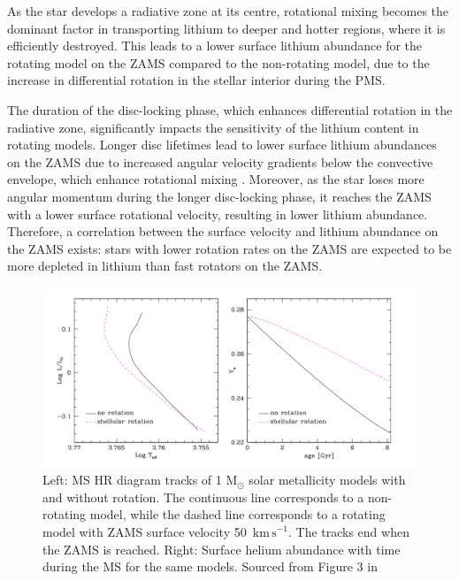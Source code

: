 As the star develops a radiative zone at its centre, rotational mixing becomes the dominant factor in transporting lithium to deeper and hotter regions, where it is efficiently destroyed. 
This leads to a lower surface lithium abundance for the rotating model on the ZAMS compared to the non-rotating model, due to the increase in differential rotation in the stellar interior during the PMS.

The duration of the disc-locking phase, which enhances differential rotation in the radiative zone, significantly impacts the sensitivity of the lithium content in rotating models. 
Longer disc lifetimes lead to lower surface lithium abundances on the ZAMS due to increased angular velocity gradients below the convective envelope, which enhance rotational mixing \citep{eggenberger_angular_2012}.
Moreover, as the star loses more angular momentum during the longer disc-locking phase, it reaches the ZAMS with a lower surface rotational velocity, resulting in lower lithium abundance.
Therefore, a correlation between the surface velocity and lithium abundance on the ZAMS exists: stars with lower rotation rates on the ZAMS are expected to be more depleted in lithium than fast rotators on the ZAMS.

\begin{figure}[h]
    \includegraphics[width=\textwidth]{Figures/intro_figures/MS_effect.png}
    \caption[Effect of rotation of main-sequence evoltuon of a stars 1 $M_{\odot}$]{Left: MS HR diagram tracks of 1 M$_{\odot}$ solar metallicity models with and without rotation. The continuous line corresponds to a non-rotating model, while the dashed line corresponds to a rotating model with ZAMS surface velocity 50 $\,\mathrm{km\,s}^{-1}$. The tracks end when the ZAMS is reached. Right: Surface helium abundance with time during the MS for the same models. Sourced from Figure 3 in \citet{eggenberger_rotation_2013}}
    \label{fig:ms_effect}
\end{figure}

